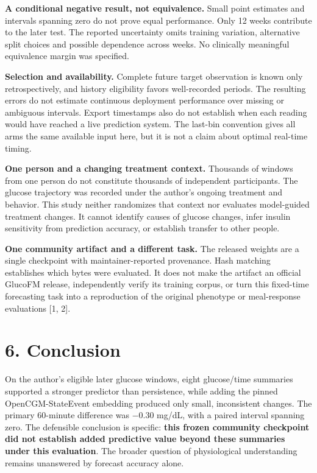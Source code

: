 \documentclass[11pt,letterpaper]{article}
\begin{document}
\textbf{A conditional negative result, not equivalence.} Small point
estimates and intervals spanning zero do not prove equal performance.
Only 12 weeks contribute to the later test. The reported uncertainty
omits training variation, alternative split choices and possible
dependence across weeks. No clinically meaningful equivalence margin was
specified.

\textbf{Selection and availability.} Complete future target observation
is known only retrospectively, and history eligibility favors
well-recorded periods. The resulting errors do not estimate continuous
deployment performance over missing or ambiguous intervals. Export
timestamps also do not establish when each reading would have reached a
live prediction system. The last-bin convention gives all arms the same
available input here, but it is not a claim about optimal real-time
timing.

\textbf{One person and a changing treatment context.} Thousands of
windows from one person do not constitute thousands of independent
participants. The glucose trajectory was recorded under the author's
ongoing treatment and behavior. This study neither randomizes that
context nor evaluates model-guided treatment changes. It cannot identify
causes of glucose changes, infer insulin sensitivity from prediction
accuracy, or establish transfer to other people.

\textbf{One community artifact and a different task.} The released
weights are a single checkpoint with maintainer-reported provenance.
Hash matching establishes which bytes were evaluated. It does not make
the artifact an official GlucoFM release, independently verify its
training corpus, or turn this fixed-time forecasting task into a
reproduction of the original phenotype or meal-response evaluations
{[}1, 2{]}.

\section{6. Conclusion}\label{conclusion}

On the author's eligible later glucose windows, eight glucose/time
summaries supported a stronger predictor than persistence, while adding
the pinned OpenCGM-StateEvent embedding produced only small,
inconsistent changes. The primary 60-minute difference was \ensuremath{-}0.30 mg/dL,
with a paired interval spanning zero. The defensible conclusion is
specific: \textbf{this frozen community checkpoint did not establish
added predictive value beyond these summaries under this evaluation}.
The broader question of physiological understanding remains unanswered
by forecast accuracy alone.
\end{document}
